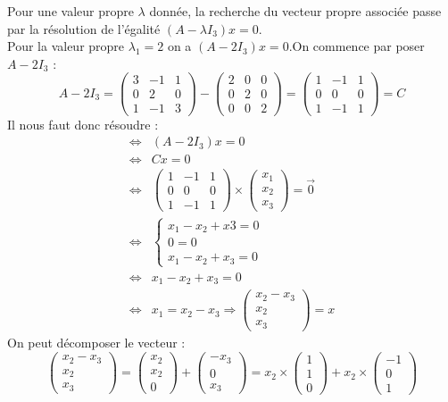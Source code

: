 \begin{ex}
Pour une valeur propre $\lambda$ donnée, la recherche du vecteur propre associée passe par la résolution de l'égalité $(A-\lambda I_3)x=0$.\\
Pour la valeur propre $\lambda_1 = 2$ on a $(A-2I_3)x=0$.On commence par poser $A-2I_3$ :
$$A-2I_3=\begin{pmatrix}3&-1&1\\0&2&0\\1&-1&3\end{pmatrix}-\begin{pmatrix}2&0&0\\0&2&0\\0&0&2\end{pmatrix}=\begin{pmatrix}1&-1&1\\0&0&0\\1&-1&1\end{pmatrix}=C$$
Il nous faut donc résoudre :
\begin{align*}
    \Leftrightarrow & (A-2I_3)x=0\\
    \Leftrightarrow & Cx=0\\
    \Leftrightarrow & \begin{pmatrix}1&-1&1\\0&0&0\\1&-1&1\end{pmatrix}\times\begin{pmatrix}x_1\\x_2\\x_3\end{pmatrix}=\overrightarrow{0}\\
    \Leftrightarrow & \begin{cases}x_1-x_2+x3=0\\0=0\\x_1-x_2+x_3=0\end{cases}\\
    \Leftrightarrow & x_1-x_2+x_3=0\\
    \Leftrightarrow & x_1=x_2-x_3
    \Rightarrow \begin{pmatrix}x_2-x_3\\x_2\\x_3\end{pmatrix}=x
\end{align*}
On peut décomposer le vecteur :
$$\begin{pmatrix}x_2-x_3\\x_2\\x_3\end{pmatrix}=\begin{pmatrix}x_2\\x_2\\0\end{pmatrix}+\begin{pmatrix}-x_3\\0\\x_3\end{pmatrix}=x_2\times\begin{pmatrix}1\\1\\0\end{pmatrix}+x_2\times\begin{pmatrix}-1\\0\\1\end{pmatrix}$$

\end{ex}
